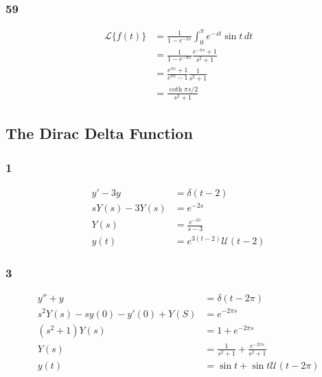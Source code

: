 \documentclass{article}
\begin{document}
\subsubsection{59}

\begin{align*}
  \mathcal{L}\{f(t)\} & = \frac{1}{1 - e^{-\pi s}} \int_0^\pi e^{-s t} \sin t \,dt \\
                      & = \frac{1}{1 - e^{-\pi s}} \frac{e^{-\pi s} + 1}{s^2 + 1}  \\
                      & = \frac{e^{\pi s} + 1}{e^{\pi s} - 1} \frac{1}{s^2 + 1}    \\
                      & = \frac{\coth \pi s / 2}{s^2 + 1}
\end{align*}

\subsection{The Dirac Delta Function}

\subsubsection{1}

\begin{align*}
  y' - 3 y        & = \delta (t - 2)                   \\
  s Y(s) - 3 Y(s) & = e^{-2 s}                         \\
  Y(s)            & = \frac{e^{-2 s}}{s - 3}           \\
  y(t)            & = e^{3 (t - 2)} \mathcal{U}(t - 2)
\end{align*}

\subsubsection{3}

\begin{align*}
  y'' + y                          & = \delta(t - 2 \pi)                                \\
  s^2 Y(s) - s y(0) - y'(0) + Y(S) & = e^{-2 \pi s}                                     \\
  (s^2 + 1) Y(s)                   & = 1 + e^{-2 \pi s}                                 \\
  Y(s)                             & = \frac{1}{s^2 + 1} + \frac{e^{-2 \pi s}}{s^2 + 1} \\
  y(t)                             & = \sin t + \sin t \mathcal{U} (t - 2 \pi)
\end{align*}
\end{document}
